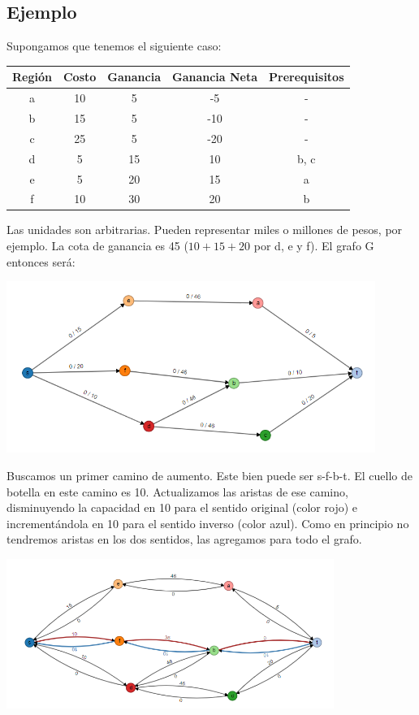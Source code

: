 \subsection{Ejemplo}
Supongamos que tenemos el siguiente caso:
\begin{center}
 \begin{tabular}{||c c c c c||} 
 \hline
 Región & Costo & Ganancia & Ganancia Neta & Prerequisitos \\ [0.5ex] 
 \hline\hline
 a & 10 & 5 & -5 & - \\ 
 \hline
 b & 15 & 5 & -10 & -\\
 \hline
 c & 25 & 5 & -20 & -\\
 \hline
 d & 5 & 15 & 10 & b, c \\
 \hline
 e & 5 & 20 & 15 & a\\ 
 \hline
 f & 10 & 30 & 20 & b\\ [1ex] 
 \hline
\end{tabular}
\end{center}
Las unidades son arbitrarias. Pueden representar miles o millones de pesos, por ejemplo. La cota de ganancia es 45 ($10+15+20$ por d, e y f). El grafo G entonces será:
    \begin{center}
    \includegraphics[width=0.9\textwidth]{Informe/Imagenes/Parte 2/ej1.png}
    \end{center}
Buscamos un primer camino de aumento. Este bien puede ser s-f-b-t. El cuello de botella en este camino es 10. Actualizamos las aristas de ese camino, disminuyendo la capacidad en 10 para el sentido original (color rojo) e incrementándola en 10 para el sentido inverso (color azul). Como en principio no tendremos aristas en los dos sentidos, las agregamos para todo el grafo. 
    \begin{center}
    \includegraphics[width=0.8\textwidth]{Informe/Imagenes/Parte 2/ej2.png}
    \end{center}
